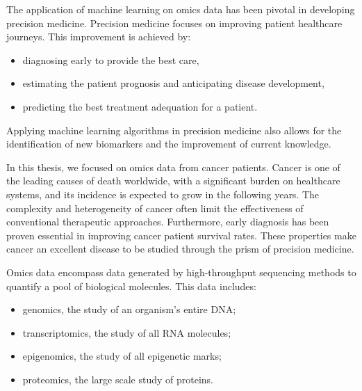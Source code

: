 \documentclass[../main.tex]{subfiles}
\begin{document}
	The application of machine learning on omics data has been pivotal in developing precision medicine.
	Precision medicine focuses on improving patient healthcare journeys.
	This improvement is achieved by:
	\begin{itemize}[nosep]
		\item diagnosing early to provide the best care,
		\item estimating the patient prognosis and anticipating disease development,
		\item predicting the best treatment adequation for a patient.
	\end{itemize}
	Applying machine learning algorithms in precision medicine also allows for the identification of new biomarkers and the improvement of current knowledge.

	In this thesis, we focused on omics data from cancer patients.
	Cancer is one of the leading causes of death worldwide, with a significant burden on healthcare systems, and its incidence is expected to grow in the following years.
	The complexity and heterogeneity of cancer often limit the effectiveness of conventional therapeutic approaches.
	Furthermore, early diagnosis has been proven essential in improving cancer patient survival rates.
	These properties make cancer an excellent disease to be studied through the prism of precision medicine.

	Omics data encompass data generated by high-throughput sequencing methods to quantify a pool of biological molecules.
	This data includes:
	\begin{itemize}[nosep]
		\item genomics, the study of an organism's entire DNA\@;
		\item transcriptomics, the study of all RNA molecules;
		\item epigenomics, the study of all epigenetic marks;
		\item proteomics, the large scale study of proteins.
	\end{itemize}
\end{document}
